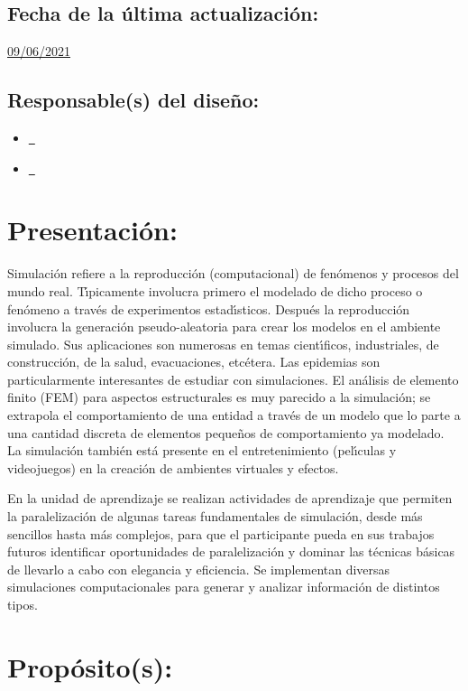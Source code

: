 \documentclass[10 pt]{article}
\begin{document}
\subsection{Fecha de la \'{u}ltima actualizaci\'{o}n:} \underline{09/06/2021}
\subsection{Responsable(s) del dise\~{n}o:}
\begin{itemize}[label={}]
\item \underline{\nsara~\sara}
\item \underline{\nelisa~\elisa}
\end{itemize}
\newpage
\section{Presentaci\'{o}n:}

Simulaci\'{o}n refiere a la reproducci\'{o}n (computacional) de
fen\'{o}menos y procesos del mundo real. T\'{\i}picamente involucra
primero el modelado de dicho proceso o fen\'{o}meno a trav\'{e}s de
experimentos estad\'{\i}sticos. Despu\'{e}s la reproducci\'{o}n
involucra la generaci\'{o}n pseudo-aleatoria para crear los modelos en
el ambiente simulado. Sus aplicaciones son numerosas en temas
cient\'{\i}ficos, industriales, de construcci\'{o}n, de la salud,
evacuaciones, etc\'{e}tera. Las epidemias son particularmente
interesantes de estudiar con simulaciones. El an\'{a}lisis de elemento
finito (FEM) para aspectos estructurales es muy parecido a la
simulaci\'{o}n; se extrapola el comportamiento de una entidad a
trav\'{e}s de un modelo que lo parte a una cantidad discreta de
elementos peque\~{n}os de comportamiento ya modelado. La
simulaci\'{o}n tambi\'{e}n est\'{a} presente en el entretenimiento
(pel\'{\i}culas y videojuegos) en la creaci\'{o}n de ambientes
virtuales y efectos.

En la unidad de aprendizaje se realizan actividades de aprendizaje que
permiten la paralelizaci\'{o}n de algunas tareas fundamentales de
simulaci\'{o}n, desde m\'{a}s sencillos hasta m\'{a}s complejos, para
que el participante pueda en sus trabajos futuros identificar
oportunidades de paralelizaci\'{o}n y dominar las t\'{e}cnicas
b\'{a}sicas de llevarlo a cabo con elegancia y eficiencia. Se
implementan diversas simulaciones computacionales para generar y
analizar informaci\'{o}n de distintos tipos.

\section{Prop\'{o}sito(s):}
\end{document}
